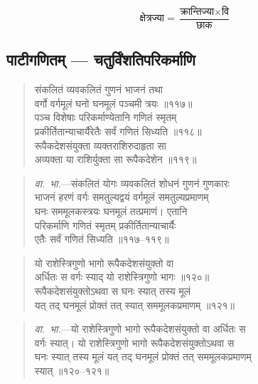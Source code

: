 \documentclass[11pt,a4paper]{article}
\newcommand{\dev}[1]{{\devanagarifont #1}}
\newenvironment{shloka}{%
  \begin{quote}
  \small
  \setlength{\leftmargin}{2em}
  \devanagarifont
}{\end{quote}}
\newenvironment{vyakhya}{%
  \begin{quote}
  \small
  \setlength{\leftmargin}{1em}
  \devanagarifont
}{\end{quote}}
\newcommand{\skt}[1]{{\devanagarifont #1}}
\begin{document}
\begin{equation}
\text{क्षेत्रज्या} = \frac{\text{क्रान्तिज्या} \times \text{वि}}{\text{छाक}}
\end{equation}

\subsection{\dev{पाटीगणितम् — चतुर्विंशतिपरिकर्माणि}}

\begin{shloka}
\skt{संकलितं व्यवकलितं गुणनं भाजनं तथा}\\[0.3em]
\skt{वर्गो वर्गमूलं घनो घनमूलं पञ्चमी त्रयः ॥११७॥}\\[0.3em]
\skt{पञ्च विशेषाः परिकर्माण्येतानि गणितं स्मृतम्}\\[0.3em]
\skt{प्रकीर्तितान्याचार्यैरेतैः सर्वं गणितं सिध्यति ॥११८॥}\\[0.3em]
\skt{रूपैकदेशसंयुक्ता व्यक्तराशिरुदाहृता सा}\\[0.3em]
\skt{अव्यक्ता या राशिर्युक्ता सा रूपैकदेशेन ॥११९॥}
\end{shloka}

\begin{vyakhya}
\textit{वा.~भा.}—\skt{संकलितं योगः व्यवकलितं शोधनं गुणनं गुणकारः}\\
\skt{भाजनं हरणं वर्गः समतुल्यद्वयं वर्गमूलं समतुल्यप्रमाणम्}\\
\skt{घनः सममूलकस्त्रयः घनमूलं तत्प्रमाणं। एतानि}\\
\skt{परिकर्माणि गणितं स्मृतम् प्रकीर्तितान्याचार्यैः}\\
\skt{एतैः सर्वं गणितं सिध्यति ॥११७--११९॥}
\end{vyakhya}

\begin{shloka}
\skt{यो राशेस्त्रिगुणो भागो रूपैकदेशसंयुक्तो वा}\\[0.3em]
\skt{अर्धितः स वर्गः स्याद् यो राशेस्त्रिगुणो भागः ॥१२०॥}\\[0.3em]
\skt{रूपैकदेशसंयुक्तोऽथवा स घनः स्यात् तस्य मूलं}\\[0.3em]
\skt{यत् तद् घनमूलं प्रोक्तं तत् स्यात् सममूलकप्रमाणम् ॥१२१॥}
\end{shloka}

\begin{vyakhya}
\textit{वा.~भा.}—\skt{यो राशेस्त्रिगुणो भागो रूपैकदेशसंयुक्तो वा अर्धितः स}\\
\skt{वर्गः स्यात्। यो राशेस्त्रिगुणो भागो रूपैकदेशसंयुक्तोऽथवा स}\\
\skt{घनः स्यात् तस्य मूलं यत् तद् घनमूलं प्रोक्तं तत् सममूलकप्रमाणम्}\\
\skt{स्यात् ॥१२०--१२१॥}
\end{vyakhya}
\end{document}
